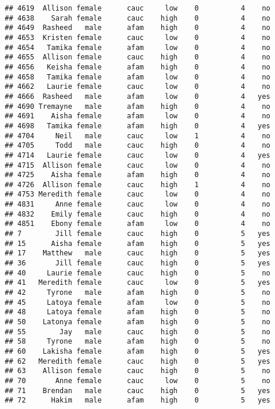 \documentclass[
]{article}
\begin{document}
\begin{verbatim}
## 4619  Allison female      cauc     low    0          4    no
## 4638    Sarah female      cauc    high    0          4    no
## 4649  Rasheed   male      afam    high    0          4    no
## 4653  Kristen female      cauc     low    0          4    no
## 4654   Tamika female      afam     low    0          4    no
## 4655  Allison female      cauc    high    0          4    no
## 4656   Keisha female      afam    high    0          4    no
## 4658   Tamika female      afam     low    0          4    no
## 4662   Laurie female      cauc     low    0          4    no
## 4666  Rasheed   male      afam     low    0          4   yes
## 4690 Tremayne   male      afam    high    0          4    no
## 4691    Aisha female      afam     low    0          4    no
## 4698   Tamika female      afam    high    0          4   yes
## 4704     Neil   male      cauc     low    1          4    no
## 4705     Todd   male      cauc    high    0          4    no
## 4714   Laurie female      cauc     low    0          4   yes
## 4715  Allison female      cauc     low    0          4    no
## 4725    Aisha female      afam    high    0          4    no
## 4726  Allison female      cauc    high    1          4    no
## 4753 Meredith female      cauc     low    0          4    no
## 4831     Anne female      cauc     low    0          4    no
## 4832    Emily female      cauc    high    0          4    no
## 4851    Ebony female      afam     low    0          4    no
## 7        Jill female      cauc    high    0          5   yes
## 15      Aisha female      afam    high    0          5   yes
## 17    Matthew   male      cauc    high    0          5   yes
## 36       Jill female      cauc    high    0          5   yes
## 40     Laurie female      cauc    high    0          5    no
## 41   Meredith female      cauc     low    0          5   yes
## 42     Tyrone   male      afam    high    0          5    no
## 45     Latoya female      afam     low    0          5    no
## 48     Latoya female      afam    high    0          5    no
## 50    Latonya female      afam    high    0          5    no
## 55        Jay   male      cauc    high    0          5    no
## 58     Tyrone   male      afam    high    0          5    no
## 60    Lakisha female      afam    high    0          5   yes
## 62   Meredith female      cauc    high    0          5   yes
## 63    Allison female      cauc    high    0          5    no
## 70       Anne female      cauc     low    0          5    no
## 71    Brendan   male      cauc    high    0          5   yes
## 72      Hakim   male      afam    high    0          5   yes

\end{verbatim}
\end{document}
